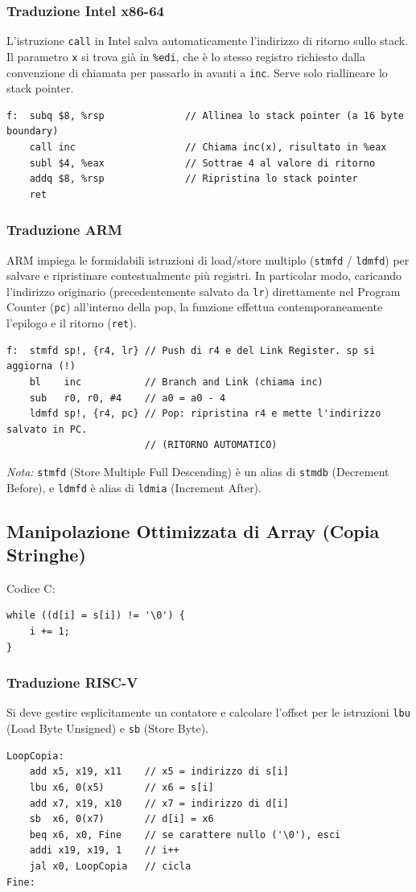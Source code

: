\documentclass[12pt, a4paper]{article}
\begin{document}
\subsubsection{Traduzione Intel x86-64}
L'istruzione \texttt{call} in Intel salva automaticamente l'indirizzo di ritorno sullo stack. Il parametro \texttt{x} si trova già in \texttt{\%edi}, che è lo stesso registro richiesto dalla convenzione di chiamata per passarlo in avanti a \texttt{inc}. Serve solo riallineare lo stack pointer.
\begin{verbatim}
f:  subq $8, %rsp              // Allinea lo stack pointer (a 16 byte boundary)
    call inc                   // Chiama inc(x), risultato in %eax
    subl $4, %eax              // Sottrae 4 al valore di ritorno
    addq $8, %rsp              // Ripristina lo stack pointer
    ret
\end{verbatim}

\subsubsection{Traduzione ARM}
ARM impiega le formidabili istruzioni di load/store multiplo (\texttt{stmfd} / \texttt{ldmfd}) per salvare e ripristinare contestualmente più registri. 
In particolar modo, caricando l'indirizzo originario (precedentemente salvato da \texttt{lr}) direttamente nel Program Counter (\texttt{pc}) all'interno della pop, la funzione effettua contemporaneamente l'epilogo e il ritorno (\texttt{ret}).
\begin{verbatim}
f:  stmfd sp!, {r4, lr} // Push di r4 e del Link Register. sp si aggiorna (!)
    bl    inc           // Branch and Link (chiama inc)
    sub   r0, r0, #4    // a0 = a0 - 4
    ldmfd sp!, {r4, pc} // Pop: ripristina r4 e mette l'indirizzo salvato in PC. 
                        // (RITORNO AUTOMATICO)
\end{verbatim}
\textit{Nota:} \texttt{stmfd} (Store Multiple Full Descending) è un alias di \texttt{stmdb} (Decrement Before), e \texttt{ldmfd} è alias di \texttt{ldmia} (Increment After).

\subsection{Manipolazione Ottimizzata di Array (Copia Stringhe)}
Codice C:
\begin{verbatim}
while ((d[i] = s[i]) != '\0') {
    i += 1;
}
\end{verbatim}

\subsubsection{Traduzione RISC-V}
Si deve gestire esplicitamente un contatore e calcolare l'offset per le istruzioni \texttt{lbu} (Load Byte Unsigned) e \texttt{sb} (Store Byte).
\begin{verbatim}
LoopCopia:
    add x5, x19, x11    // x5 = indirizzo di s[i]
    lbu x6, 0(x5)       // x6 = s[i]
    add x7, x19, x10    // x7 = indirizzo di d[i]
    sb  x6, 0(x7)       // d[i] = x6
    beq x6, x0, Fine    // se carattere nullo ('\0'), esci
    addi x19, x19, 1    // i++
    jal x0, LoopCopia   // cicla
Fine:
\end{verbatim}
\end{document}
